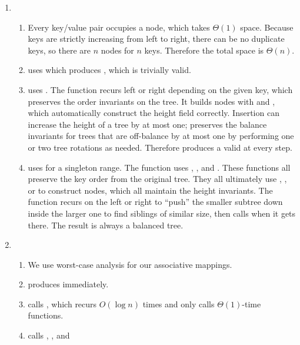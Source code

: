 \documentclass{article}
\begin{document}
\begin{enumerate}
\begin{enumerate}
  \item
    \begin{enumerate}
    \item Every key/value pair occupies a node, which takes \(\Theta(1)\)
      space.  Because keys are strictly increasing from left to right,
      there can be no duplicate keys, so there are \(n\) nodes for \(n\) keys.
      Therefore the total space is \(\Theta(n)\).
    \item {} uses  which produces ,
      which is trivially valid.
    \item {} uses .  The 
      function recurs left or right depending on the given key, which preserves
      the order invariants on the tree.  It builds nodes with
       and , which automatically
      construct the height field correctly.  Insertion can increase the height
      of a tree by at most one;  preserves the
      balance invariants for trees that are off-balance by at most one by
      performing one or two tree rotations as needed.
      Therefore  produces a valid  at every step.
    \item {} uses  for a singleton range.
      The function  uses ,
      , and .  These functions all
      preserve the key order from the original tree.  They all ultimately use
      , , or
       to construct nodes, which all maintain the height
      invariants.  The  function recurs on the left or
      right to ``push'' the smaller subtree down inside the larger one to find
      siblings of similar size, then calls  when it
      gets there.  The result is always a balanced tree.
    \end{enumerate}
  \item
    \begin{enumerate}
    \item We use worst-case analysis for our associative mappings.
    \item {} produces  immediately.
    \item {} calls , which recurs \(O(\log n)\)
      times and only calls \(\Theta(1)\)-time functions.
    \item {} calls , , and

\end{enumerate}
\end{enumerate}
\end{enumerate}
\end{document}
